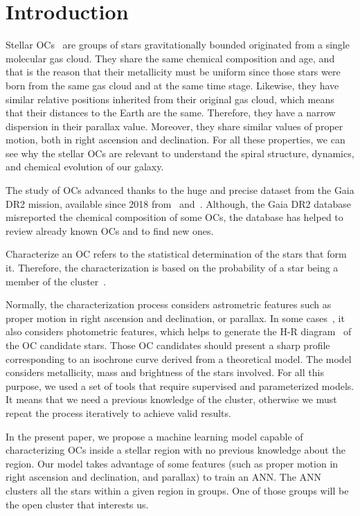 \documentclass[preprint,12pt,authoryear]{elsarticle}
\begin{document}
\section{Introduction}

Stellar OCs~\cite{janes1982open} are groups of stars gravitationally bounded originated from a single molecular gas cloud. They share the same chemical composition and age, and that is the reason that their metallicity must be uniform since those stars were born from the same gas cloud and at the same time stage. Likewise, they have similar relative positions inherited from their original gas cloud, which means that their distances to the Earth are the same. Therefore, they have a narrow dispersion in their parallax value. Moreover, they share similar values of proper motion, both in right ascension and declination. For all these properties, we can see why the stellar OCs are relevant to understand the spiral structure, dynamics, and chemical evolution of our galaxy.

The study of OCs advanced thanks to the huge and precise dataset from the Gaia DR2 mission, available since 2018 from~\cite{collaboration2016description} and~\cite{gaia2018gaia}. Although, the Gaia DR2 database misreported the chemical composition of some OCs, the database has helped to review already known OCs and to find new ones.

Characterize an OC refers to the statistical determination of the stars that form it. Therefore, the characterization is based on the probability of a star being a member of the cluster~\cite{sampedro2016caracterizacion}.

Normally, the characterization process considers astrometric features such as proper motion in right ascension and declination, or parallax. In some cases~\cite{oliveira2013fitting}, it also considers photometric features, which helps to generate the H-R diagram~\cite{hypki2018gaia} of the OC candidate stars. Those OC candidates should present a sharp profile corresponding to an isochrone curve derived from a theoretical model. The model considers metallicity, mass and brightness of the stars involved. For all this purpose, we used a set of tools that require supervised and parameterized models. It means that we need a previous knowledge of the cluster, otherwise we must repeat the process iteratively to achieve valid results.

In the present paper, we propose a machine learning model capable of characterizing OCs inside a stellar region with no previous knowledge about the region. Our model takes advantage of some features (such as proper motion in right ascension and declination, and parallax) to train an ANN. The ANN clusters all the stars within a given region in groups. One of those groups will be the open cluster that interests us.
\end{document}
